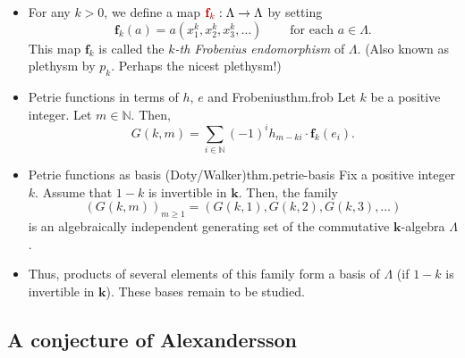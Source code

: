 \documentclass[numbers=enddot,12pt,final,onecolumn,notitlepage]{scrartcl}%
\newcommand{\defn}[1]{{\color{darkred}\emph{#1}}}
\newcommand{\defnm}[1]{{\color{darkred} #1}}
\newcommand{\0}{\phantom{c}}
\let\sumnonlimits\sum
\renewcommand{\sum}{\sumnonlimits\limits}
\newcommand{\nowbox}{\hphantom{x} \vspace{-1.5pc}}
\begin{document}
\begin{itemize}
\item For any $k>0$, we define a map $\defnm{\mathbf{f}_{k}}:\Lambda
\rightarrow\Lambda$ by setting%
\[
\mathbf{f}_{k}\left(  a\right)  =a\left(  x_{1}^{k},x_{2}^{k},x_{3}^{k}%
,\ldots\right)  \ \ \ \ \ \ \ \ \ \ \text{for each }a\in\Lambda.
\]
This map $\mathbf{f}_{k}$ is called the \defn{$k$-th Frobenius endomorphism}
of $\Lambda$. (Also known as plethysm by $p_{k}$. Perhaps the nicest plethysm!)

\item \nowbox
\begin{theorem}{Petrie functions in terms of $h$, $e$ and Frobenius}{thm.frob}
Let $k$ be a positive integer. Let $m\in\mathbb{N}$.
Then,%
\[
G\left(  k,m\right)  =\sum_{i\in\mathbb{N}}\left(  -1\right)  ^{i}%
h_{m-ki}\cdot\mathbf{f}_{k}\left(  e_{i}\right)  .
\]
\end{theorem}

\item \nowbox
\begin{theorem}{Petrie functions as basis (Doty/Walker)}{thm.petrie-basis}
Fix a positive integer $k$. Assume that $1-k$ is
invertible in $\mathbf{k}$. Then, the family
\[
\left(  G\left(  k,m\right)
\right)  _{m\geq1}=\left(  G\left(  k,1\right)  ,G\left(  k,2\right)
,G\left(  k,3\right)  ,\ldots\right)
\]
is an algebraically independent
generating set of the commutative $\mathbf{k}$-algebra $\Lambda$.
\end{theorem}

\item Thus, products of several elements of this family form a basis of
$\Lambda$ (if $1-k$ is invertible in $\mathbf{k}$). These bases remain to be studied.
\end{itemize}

\subsection{A conjecture of Alexandersson}
\end{document}

